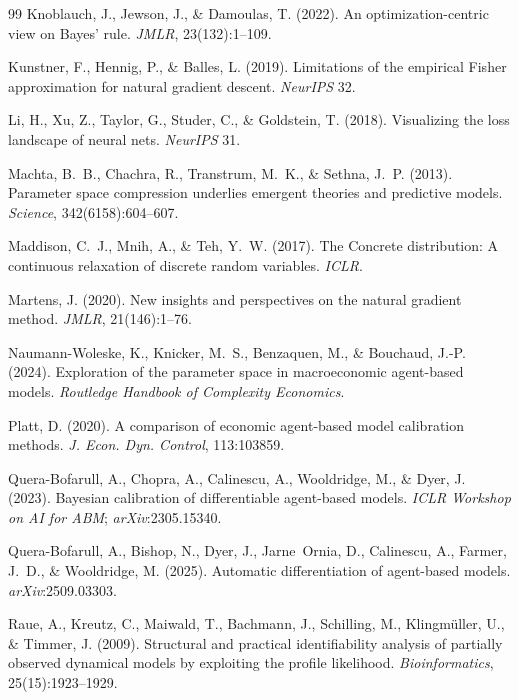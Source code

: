 \documentclass[10pt,twocolumn]{article}
\begin{document}
{\begin{thebibliography}{99}
Knoblauch, J., Jewson, J., \& Damoulas, T. (2022). An optimization-centric view on
Bayes' rule. \textit{JMLR}, 23(132):1--109.

Kunstner, F., Hennig, P., \& Balles, L. (2019). Limitations of the empirical Fisher
approximation for natural gradient descent. \textit{NeurIPS} 32.

Li, H., Xu, Z., Taylor, G., Studer, C., \& Goldstein, T. (2018). Visualizing the
loss landscape of neural nets. \textit{NeurIPS} 31.

Machta, B.~B., Chachra, R., Transtrum, M.~K., \& Sethna, J.~P. (2013). Parameter
space compression underlies emergent theories and predictive models.
\textit{Science}, 342(6158):604--607.

Maddison, C.~J., Mnih, A., \& Teh, Y.~W. (2017). The Concrete distribution: A
continuous relaxation of discrete random variables. \textit{ICLR}.

Martens, J. (2020). New insights and perspectives on the natural gradient method.
\textit{JMLR}, 21(146):1--76.

Naumann-Woleske, K., Knicker, M.~S., Benzaquen, M., \& Bouchaud, J.-P. (2024).
Exploration of the parameter space in macroeconomic agent-based models.
\textit{Routledge Handbook of Complexity Economics}.

Platt, D. (2020). A comparison of economic agent-based model calibration methods.
\textit{J. Econ. Dyn. Control}, 113:103859.

Quera-Bofarull, A., Chopra, A., Calinescu, A., Wooldridge, M., \& Dyer, J. (2023).
Bayesian calibration of differentiable agent-based models. \textit{ICLR Workshop on
AI for ABM}; \textit{arXiv}:2305.15340.

Quera-Bofarull, A., Bishop, N., Dyer, J., Jarne~Ornia, D., Calinescu, A., Farmer,
J.~D., \& Wooldridge, M. (2025). Automatic differentiation of agent-based models.
\textit{arXiv}:2509.03303.

Raue, A., Kreutz, C., Maiwald, T., Bachmann, J., Schilling, M., Klingm\"uller, U.,
\& Timmer, J. (2009). Structural and practical identifiability analysis of partially
observed dynamical models by exploiting the profile likelihood.
\textit{Bioinformatics}, 25(15):1923--1929.


\end{thebibliography}}
\end{document}
